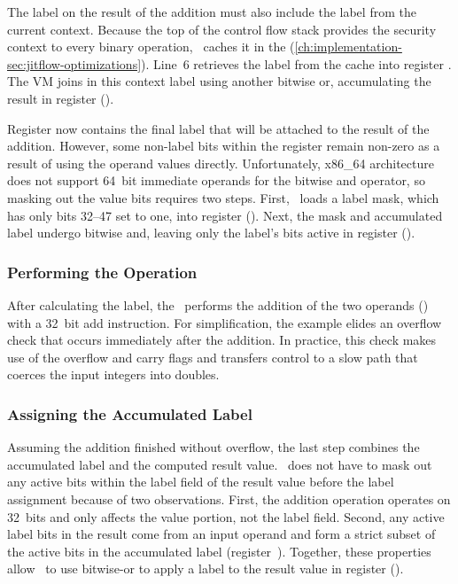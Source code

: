 The label on the result of the addition must also include the label from the current context.
Because the top of the control flow stack provides the security context to every binary operation, \JitFlow\ caches it in the  (\autoref{ch:implementation-sec:jitflow-optimizations}).
Line~6 retrieves the label from the cache into register .
The VM joins in this context label using another bitwise or, accumulating the result in register  ().

Register  now contains the final label that will be attached to the result of the addition.
However, some non-label bits within the register remain non-zero as a result of using the operand values directly.
Unfortunately, x86\_64 architecture does not support 64~bit immediate operands for the bitwise and operator, so masking out the value bits requires two steps.
First, \JitFlow\ loads a label mask, which has only bits 32--47 set to one, into register  ().
Next, the mask and accumulated label undergo bitwise and, leaving only the label's bits active in register  ().

\subsubsection{Performing the Operation}

After calculating the label, the \JitFlow\ performs the addition of the two operands () with a 32~bit add instruction.
For simplification, the example elides an overflow check that occurs immediately after the addition.
In practice, this check makes use of the overflow and carry flags and transfers control to a slow path that coerces the input integers into doubles.

\subsubsection{Assigning the Accumulated Label}

Assuming the addition finished without overflow, the last step combines the accumulated label and the computed result value.
\JitFlow\ does not have to mask out any active bits within the label field of the result value before the label assignment because of two observations.
First, the addition operation operates on 32~bits and only affects the value portion, not the label field.
Second, any active label bits in the result come from an input operand and form a strict subset of the active bits in the accumulated label (register~).
Together, these properties allow \JitFlow\ to use bitwise-or to apply a label to the result value in register  ().


